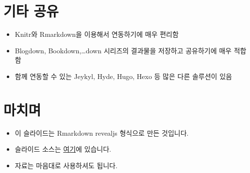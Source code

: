 \documentclass[
]{article}
\providecommand{\tightlist}{%
  \setlength{\itemsep}{0pt}\setlength{\parskip}{0pt}}
\begin{document}
\hypertarget{uxae30uxd0c0-uxacf5uxc720}{%
\section{기타 공유}\label{uxae30uxd0c0-uxacf5uxc720}}

\begin{itemize}
\tightlist
\item
  Knitr와 Rmarkdown을 이용해서 연동하기에 매우 편리함
\item
  Blogdown, Bookdown,\ldots down 시리즈의 결과물을 저장하고 공유하기에
  매우 적합함
\item
  함께 연동할 수 있는 Jeykyl, Hyde, Hugo, Hexo 등 많은 다른 솔루션이
  있음
\end{itemize}

\hypertarget{uxb9c8uxce58uxba70}{%
\section{마치며}\label{uxb9c8uxce58uxba70}}

\begin{itemize}
\tightlist
\item
  이 슬라이드는 Rmarkdown revealjs 형식으로 만든 것입니다.
\item
  슬라이드 소스는
  \href{https://github.com/aidenhong/aidenhong.github.io/tree/master/presentations/setup-github-for-making-a-static-website}{여기}에
  있습니다.
\item
  자료는 마음대로 사용하셔도 됩니다.
\end{itemize}
\end{document}
